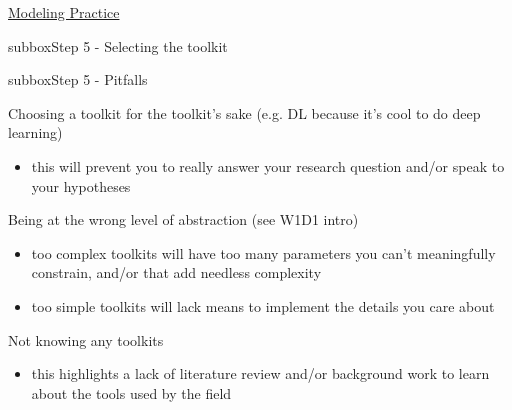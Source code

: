 \begin{textbox}{\href{https://compneuro.neuromatch.io/projects/modelingsteps/ModelingSteps_5through10.html}{Modeling Practice  } }
\begin{subbox}{subbox}{Step 5 - Selecting the toolkit}
  \end{subbox}
\begin{subbox}{subbox}{Step 5 - Pitfalls }
\scriptsize


Choosing a toolkit for the toolkit's sake (e.g. DL because it's cool to do deep learning)
\begin{itemize}
    \item this will prevent you to really answer your research question and/or speak to your hypotheses\end{itemize}

Being at the wrong level of abstraction (see W1D1 intro)
\begin{itemize}
    \item too complex toolkits will have too many parameters you can't meaningfully constrain, and/or that add needless complexity
 \item too simple toolkits will lack means to implement the details you care about\end{itemize}
  
Not knowing any toolkits
\begin{itemize}
    \item this highlights a lack of literature review and/or background work to learn about the tools used by the field\end{itemize}
\end{subbox}
 
 
\end{textbox}
